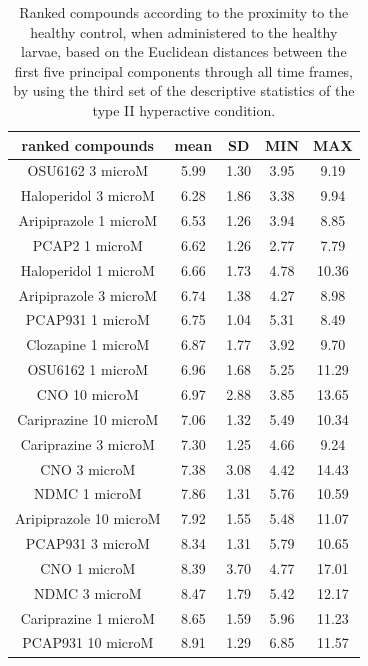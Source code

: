 \begin{table}[h!]\tiny
\centering
\caption{Ranked compounds according to the proximity to the healthy control, when administered to the healthy larvae, based on the Euclidean distances between the first five principal components through all time frames, by using the third set of the descriptive statistics of the type II hyperactive condition.}
\begin{tabular}{|c|c|c|c|c|}
\hline
ranked compounds             & mean & SD   & MIN  & MAX   \\ \hline
OSU6162 3 microM       & 5.99  & 1.30  & 3.95 & 9.19  \\ \hline
Haloperidol 3 microM   & 6.28  & 1.86 & 3.38 & 9.94  \\ \hline
Aripiprazole 1 microM  & 6.53  & 1.26 & 3.94 & 8.85  \\ \hline
PCAP2 1 microM         & 6.62  & 1.26 & 2.77 & 7.79  \\ \hline
Haloperidol 1 microM   & 6.66  & 1.73 & 4.78 & 10.36 \\ \hline
Aripiprazole 3 microM  & 6.74  & 1.38 & 4.27 & 8.98  \\ \hline
PCAP931 1 microM       & 6.75  & 1.04 & 5.31 & 8.49  \\ \hline
Clozapine 1 microM     & 6.87  & 1.77 & 3.92 & 9.70   \\ \hline
OSU6162 1 microM       & 6.96  & 1.68 & 5.25 & 11.29 \\ \hline
CNO 10 microM          & 6.97  & 2.88 & 3.85 & 13.65 \\ \hline
Cariprazine 10 microM  & 7.06  & 1.32 & 5.49 & 10.34 \\ \hline
Cariprazine 3 microM   & 7.30   & 1.25 & 4.66 & 9.24  \\ \hline
CNO 3 microM           & 7.38  & 3.08 & 4.42 & 14.43 \\ \hline
NDMC 1 microM          & 7.86  & 1.31 & 5.76 & 10.59 \\ \hline
Aripiprazole 10 microM & 7.92  & 1.55 & 5.48 & 11.07 \\ \hline
PCAP931 3 microM       & 8.34  & 1.31 & 5.79 & 10.65 \\ \hline
CNO 1 microM           & 8.39  & 3.70  & 4.77 & 17.01 \\ \hline
NDMC 3 microM          & 8.47  & 1.79 & 5.42 & 12.17 \\ \hline
Cariprazine 1 microM   & 8.65  & 1.59 & 5.96 & 11.23 \\ \hline
PCAP931 10 microM      & 8.91  & 1.29 & 6.85 & 11.57 \\ \hline

\end{tabular}
\end{table}
